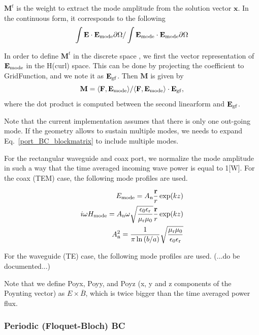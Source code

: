 \documentclass[11pt,a4paper,final]{report}
\begin{document}
$\mathbf{M}^t$ is the weight to extract the mode amplitude from the solution vector $\mathbf{x}$. In the continuous form, it corresponds to the following 
\begin{equation}
\int \mathbf{E} \cdot \mathbf{E}_{\rm mode} \partial\Omega/\int \mathbf{E}_{\rm mode}  \cdot \mathbf{E}_{\rm mode} \partial\Omega
\end{equation}

In order to define $\mathbf{M}^t$ in the discrete space , we first the vector representation of $\mathbf{E}_{\rm mode}$ in the H(curl) space. This can be done by projecting the coefficient to GridFunction, and we note it as $\mathbf{E}_{\rm gf}$. Then $\mathbf{M}$ is given by
\begin{equation}
\mathbf{M} = \langle \mathbf{F}, \mathbf{E_{\rm mode}} \rangle / \langle \mathbf{F}, \mathbf{E}_{\rm mode} \rangle \cdot \mathbf{E}_{\rm gf},
 \end{equation}
where the dot product is computed between the second linearform and $\mathbf{E}_{\rm gf}$.

Note that the current implementation assumes that there is only one out-going mode. If the geometry allows to sustain multiple modes, we needs to expand Eq.~\ref{port_BC_blockmatrix} to include multiple modes. 

For the rectangular waveguide and coax port, we normalize the mode amplitude in such a way that the time averaged  incoming wave power is equal to 1[W]. For the coax (TEM) case, the following mode profiles are used.

 \begin{align}
E_{\rm mode} = A_{\rm n} \frac{\mathbf{r}}{r} \exp(kz)
\\
i \omega H_{\rm mode} = A_{\rm n} \omega \sqrt{\frac{\epsilon_{\rm 0}\epsilon_{\rm r}}{\mu_{\rm r}\mu_{\rm 0}}} \frac{\mathbf{r}}{r} \exp(kz)
\\
 A_{\rm n}^2 = \frac{1}{\pi \ln{(b/a)}} \sqrt{\frac{\mu_{\rm r}\mu_{\rm 0}}{\epsilon_{\rm 0}\epsilon_{\rm r}}}
\end{align}

For the waveguide (TE) case, the following mode profiles are used.
(...do be documented...)

Note that we define Poyx, Poyy, and Poyz (x, y and z components of the Poynting vector) as $E \times \overline{B}$, which is twice bigger than the time averaged power flux.


 
 \subsubsection{Periodic (Floquet-Bloch) BC}
 
\end{document}
